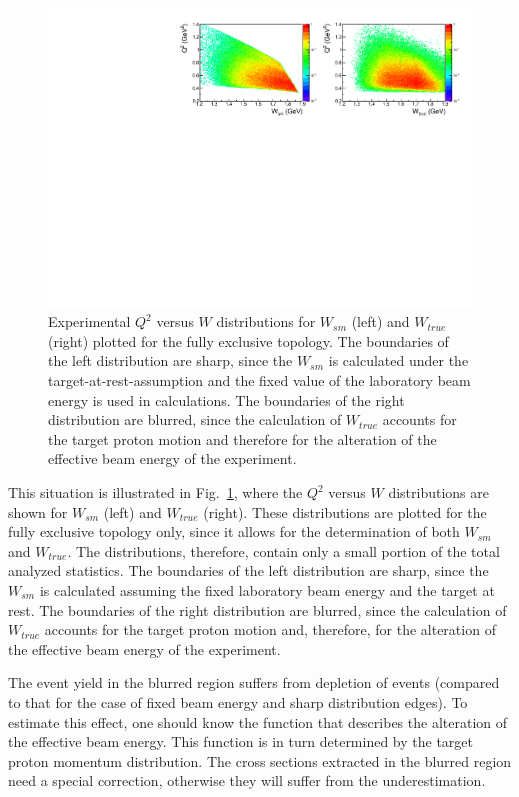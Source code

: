 \begin{figure}[htp]
\begin{center}
\includegraphics[width=\textwidth]{pictures/cross_section/blurring.pdf}
\caption{\small Experimental $Q^2$ versus $W$ distributions for $W_{sm}$ (left) and $W_{true}$ (right) plotted for the fully exclusive topology. The boundaries of the left distribution are sharp, since the $W_{sm}$ is calculated under the target-at-rest-assumption and the fixed value of the laboratory beam energy is used in calculations. The boundaries of the right distribution are blurred, since the calculation of $W_{true}$ accounts for the target proton motion and therefore for the alteration of the effective beam energy of the experiment.} \label{fig:blurring}
\end{center}
\end{figure}

This situation is illustrated in Fig.~\ref{fig:blurring}, where the $Q^2$ versus $W$ distributions are shown for $W_{sm}$ (left) and $W_{true}$ (right). These distributions are plotted for the fully exclusive topology only, since it allows for the determination of both $W_{sm}$ and $W_{true}$. The distributions, therefore, contain only a small portion of the total analyzed statistics. The boundaries of the left distribution are sharp, since the $W_{sm}$ is calculated assuming the fixed laboratory beam energy and the target at rest. The boundaries of the right distribution are blurred, since the calculation of $W_{true}$ accounts for the target proton motion and, therefore, for the alteration of the effective beam energy of the experiment.


The event yield in the blurred region suffers from depletion of events (compared to that for the case of fixed beam energy and sharp distribution edges). To estimate this effect, one should know the function that describes the alteration of the effective beam energy. This function is in turn determined by the target proton momentum distribution. The cross sections extracted in the blurred region need a special correction, otherwise they will suffer from the underestimation.



